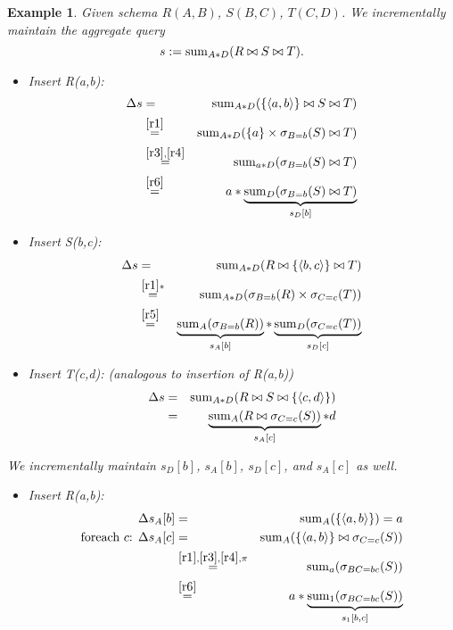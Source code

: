 \documentclass[10pt,twocolumn]{article}
\newcommand{\tuple}[1]{{\langle#1\rangle}}
\newtheorem{example}[theorem]{Example}
\begin{document}
\begin{example}\em
Given schema $R(A,B)$, $S(B,C)$, $T(C,D)$.
We incrementally maintain the aggregate query
\[
s := \mathrm{sum}_{A*D}(R \bowtie S \bowtie T).
\]
\begin{itemize}
\item
Insert R(a,b):
\begin{eqnarray*}
\Delta s &=& \algsum_{A*D}(\{\tuple{a,b}\} \bowtie S \bowtie T)
\\ &\stackrel{\ref{r1}}{=}&
\algsum_{A*D}(\{a\} \times \sigma_{B=b}(S) \bowtie T)
\\ &\stackrel{\ref{r3},\ref{r4}}{=}&
\algsum_{a*D}(\sigma_{B=b}(S) \bowtie T)
\\ &\stackrel{\ref{r6}}{=}&
a * \underbrace{\algsum_{D}(\sigma_{B=b}(S) \bowtie T)}_{s_D[b]}
\end{eqnarray*}

\item
Insert S(b,c):
\begin{eqnarray*}
\Delta s &=& \algsum_{A*D}(R \bowtie \{\tuple{b,c}\} \bowtie T)
\\ &\stackrel{\ref{r1}*}{=}&
\algsum_{A*D}(\sigma_{B=b}(R) \times \sigma_{C=c}(T))
\\ &\stackrel{\ref{r5}}{=}&
\underbrace{\algsum_{A}(\sigma_{B=b}(R))}_{s_A[b]} *
\underbrace{\algsum_{D}(\sigma_{C=c}(T))}_{s_D[c]}
\end{eqnarray*}

\item
Insert T(c,d): (analogous to insertion of R(a,b))
\begin{eqnarray*}
\Delta s &=& \algsum_{A*D}(R \bowtie S \bowtie \{\tuple{c,d}\})
\\ &=&
\underbrace{\algsum_{A}(R \bowtie \sigma_{C=c}(S))}_{s_A[c]} * d
\end{eqnarray*}
\end{itemize}

We incrementally maintain $s_D[b]$, $s_A[b]$, $s_D[c]$, and
$s_A[c]$ as well.

\begin{itemize}
\item
Insert R(a,b):
\begin{eqnarray*}
\Delta s_A[b] &=& \algsum_{A}(\{\tuple{a,b}\}) = a
\\
\mbox{foreach $c$: }
\Delta s_A[c] &=& \algsum_{A}(\{\tuple{a,b}\} \bowtie \sigma_{C=c}(S))
\\ &\stackrel{\ref{r1},\ref{r3},\ref{r4},\pi}{=}&
\algsum_{a}(\sigma_{BC=bc}(S))
\\ &\stackrel{\ref{r6}}{=}&
a * \underbrace{\algsum_{1}(\sigma_{BC=bc}(S))}_{s_1[b,c]}
\end{eqnarray*}


\end{itemize}
\end{example}
\end{document}

